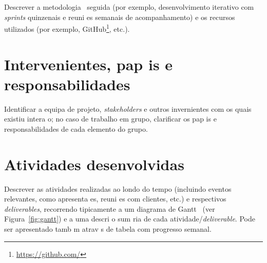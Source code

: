 \documentclass{article}
\begin{document}
\begin{info}
Descrever a metodologia~\cite{despa2014comparative} seguida (por
exemplo, desenvolvimento iterativo com \emph{sprints} quinzenais e reuni es
semanais de acompanhamento) e os recursos utilizados (por exemplo,
GitHub\footnote{\url{https://github.com/}}, etc.). 
\end{info}

\section{Intervenientes, pap is e responsabilidades}

\begin{info}
Identificar a equipa de projeto, \emph{stakeholders} e outros invernientes com os quais existiu intera o; no caso de trabalho em grupo, clarificar os pap is e responsabilidades de cada elemento do grupo.
\end{info}

\section{Atividades desenvolvidas}

\begin{info}
Descrever as atividades realizadas ao londo do tempo (incluindo eventos relevantes, como apresenta es, reuni es com clientes, etc.) e respectivos \emph{deliverables}, recorrendo tipicamente a um diagrama de Gantt~\cite{gantt} (ver Figura~\ref{fig:gantt}) e a uma descri o sum ria de cada atividade/\emph{deliverable}.
Pode ser apresentado tamb m atrav s de tabela com progresso semanal.
\end{info}
\end{document}
